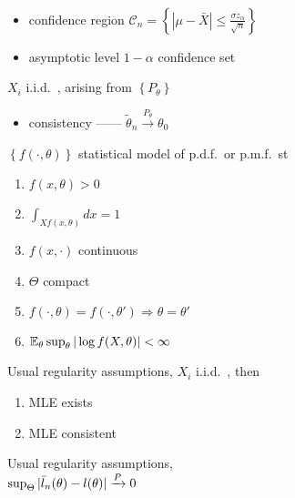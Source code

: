 \begin{example}\,
    \begin{itemize}
        \item confidence region $\mathcal{C}_n = \left\{ |\mu - \bar{X}| \leq \frac{\sigma z_\alpha}{\sqrt{n}} \right\}$
        \item asymptotic level $1 - \alpha$ confidence set
    \end{itemize}
\end{example}

\begin{setting}
    $X_i$ i.i.d.\ , arising from $\left\{ P_\theta \right\}$
\end{setting}

\begin{itemize}
    \item consistency ------ $\tilde \theta_n \xrightarrow{P_\theta} \theta_0$
\end{itemize}

\begin{assumption}
    $\left\{ f(\cdot, \theta) \right\}$ statistical model of p.d.f.\  or p.m.f.\ st
    \begin{enumerate}
        \item $f(x, \theta) > 0$
        \item $\int_{Xf(x, \theta)}dx = 1$
        \item $f(x, \cdot)$ continuous
        \item $\Theta$ compact
        \item $f(\cdot, \theta) = f(\cdot, \theta') \Rightarrow \theta = \theta'$
        \item $\mathbb{E}_{\theta}\sup_{\theta}|\log f(X, \theta)| < \infty$
    \end{enumerate}
\end{assumption}

\begin{thm}
    Usual regularity assumptions, $X_i$ i.i.d.\ , then
    \begin{enumerate}
        \item MLE exists
        \item MLE consistent
    \end{enumerate}
\end{thm}

\begin{thm}
    Usual regularity assumptions,\\ $\sup_\Theta|\bar{l}_n(\theta) - l(\theta)| \xrightarrow{P} 0$
\end{thm}

